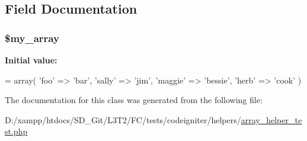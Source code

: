 \subsection{Field Documentation}
\hypertarget{class_array__helper__test_afb14849b6d5ca8632071134e123af8d9}{}
\subsubsection[{\$my\+\_\+array}]{\setlength{\rightskip}{0pt plus 5cm}\$my\+\_\+array}\label{class_array__helper__test_afb14849b6d5ca8632071134e123af8d9}
{\bfseries Initial value\+:}
\begin{DoxyCode}
= array(
        \textcolor{stringliteral}{'foo'}    => \textcolor{stringliteral}{'bar'},
        \textcolor{stringliteral}{'sally'}  => \textcolor{stringliteral}{'jim'},
        \textcolor{stringliteral}{'maggie'} => \textcolor{stringliteral}{'bessie'},
        \textcolor{stringliteral}{'herb'}   => \textcolor{stringliteral}{'cook'}
    )
\end{DoxyCode}


The documentation for this class was generated from the following file\+:\begin{DoxyCompactItemize}
\item 
D\+:/xampp/htdocs/\+S\+D\+\_\+\+Git/\+L3\+T2/\+F\+C/tests/codeigniter/helpers/\hyperlink{array__helper__test_8php}{array\+\_\+helper\+\_\+test.\+php}\end{DoxyCompactItemize}
